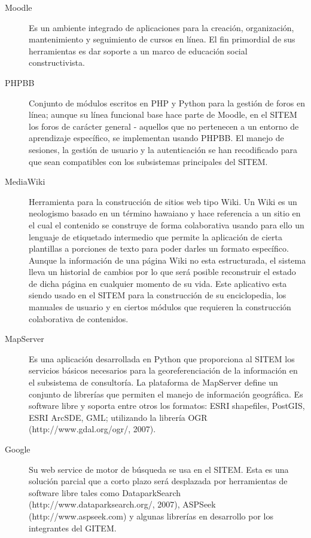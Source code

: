 \begin{description}
 \item[Moodle] Es un ambiente integrado de aplicaciones para la creación, organización, mantenimiento y seguimiento de cursos en línea. El fin primordial de sus herramientas es dar soporte a un marco de educación social constructivista.

\item[PHPBB] Conjunto de módulos escritos en PHP y Python para la gestión de foros en línea; aunque su línea funcional base hace parte de Moodle, en el SITEM los foros de carácter general - aquellos que no pertenecen a un entorno de aprendizaje específico, se implementan usando PHPBB. El manejo de sesiones, la gestión de usuario y la autenticación se han recodificado para que sean compatibles con los subsistemas principales del SITEM.

\item[MediaWiki] Herramienta para la construcción de sitios web tipo Wiki. Un Wiki es un neologismo basado en un término hawaiano y hace referencia a un sitio en el cual el contenido se construye de forma colaborativa usando para ello un lenguaje de etiquetado intermedio que permite la aplicación de cierta plantillas a porciones de texto para poder darles un formato específico. Aunque la información de una página Wiki no esta estructurada, el sistema lleva un historial de cambios por lo que será posible reconstruir el estado de dicha página en cualquier momento de su vida. Este aplicativo esta siendo usado en el SITEM para la construcción de su enciclopedia, los manuales de usuario y en ciertos módulos que requieren la construcción colaborativa de contenidos.

\item[MapServer] Es una aplicación desarrollada en Python que proporciona al SITEM los servicios básicos necesarios para la georeferenciación de la información en el subsistema de consultoría. La plataforma de MapServer define un conjunto de librerías que permiten el manejo de información geográfica. Es software libre y soporta entre otros los formatos: ESRI shapefiles, PostGIS, ESRI ArcSDE, GML; utilizando la librería OGR (http://www.gdal.org/ogr/, 2007).

\item[Google] Su web service de motor de búsqueda se usa en el SITEM. Esta es una solución parcial que a corto plazo será desplazada por herramientas de software libre tales como DataparkSearch (http://www.dataparksearch.org/, 2007), ASPSeek (http://www.aspseek.com) y algunas librerías en desarrollo por los integrantes del GITEM.


\end{description}
